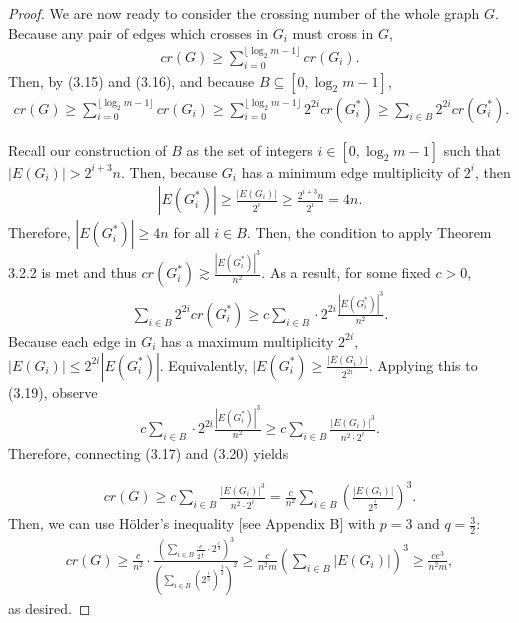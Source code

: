 \documentclass{scrippsthesisclass}
\theoremstyle{definition}
\begin{document}
\begin{proof}
We are now ready to consider the crossing number of the whole graph $G$. 
Because any pair of edges which crosses in $G_i$ must cross in $G$,  
\begin{align}
cr(G) \geq \sum_{i=0}^{\lfloor \log_2 m - 1 \rfloor} cr(G_i). 
\end{align}
Then, by (3.15) and (3.16), and because $B \subseteq [0, \log_2 m - 1]$, 
\begin{align}
cr(G) \geq \sum_{i=0}^{\lfloor \log_2 m - 1\rfloor} cr(G_i) \geq \sum_{i=0}^{\lfloor \log_2 m - 1 \rfloor} 2^{2i} cr(G_i^*) \geq \sum_{i \in B} 2^{2i} cr(G_i^*).
\end{align}

Recall our construction of $B$ as the set of integers $i \in [0, \log_2 m - 1]$ such that $|E(G_i)| > 2^{i+3}n$.
Then, because $G_i$ has a minimum edge multiplicity of $2^i$, then 
\begin{align}
    |E(G_i^*)| \geq \frac{|E(G_i)|}{2^i} \geq \frac{2^{i + 3 } n}{2^i} = 4n.
\end{align}
Therefore, $|E(G_i^*)| \geq 4n$ for all $i \in B$.
Then, the condition to apply Theorem 3.2.2 is met and thus $cr(G_i^*) \gtrsim \frac{|E(G_i^*)|^3}{n^2}$. 
As a result, for some fixed $c > 0$,
\begin{align}
\sum_{i \in B} 2^{2i} cr(G_i^*) \geq c\sum_{i \in B} \cdot 2^{2i} \frac{|E(G_i^*)|^3}{n^2}. 
\end{align}
Because each edge in $G_i$ has a maximum multiplicity $2^{2i}$, $|E(G_i)| \leq 2^{2i} |E(G_i^*)|$.
Equivalently, $|E(G_i^*) \geq \frac{|E(G_i)|}{2^{2i}}$. 
Applying this to (3.19), observe
\begin{align}
c\sum_{i \in B} \cdot 2^{2i} \frac{|E(G_i^*)|^3}{n^2} \geq c\sum_{i \in B}  \frac{|E(G_i)|^3}{n^2 \cdot 2^i}.
\end{align}
Therefore, connecting (3.17) and (3.20) yields

\begin{align}
cr(G) \geq c\sum_{i \in B}  \frac{|E(G_i)|^3}{n^2 \cdot 2^i} = \frac{c}{n^2} \sum_{i \in B} \left( \frac{|E(G_i)|}{2^{\frac{i}{3}}} \right)^3. 
\end{align}
Then, we can use H\"{o}lder's inequality [see Appendix B] with $p = 3$ and $q = \frac{3}{2}$:
\begin{align}
cr(G) \geq \frac{c}{n^2} \cdot \frac{\left(\sum_{i \in B} \frac{e}{2^{\frac{i}{3}}} \cdot 2^{\frac{i}{3}}\right)^3}{\left( \sum_{i \in B} \left(2^{\frac{i}{3}}\right)^{\frac{3}{2}} \right)^2} \geq \frac{c}{n^2m} \left( \sum_{i \in B} |E(G_i)| \right)^3 \geq \frac{ce^3}{n^2m},
\end{align}
as desired.
\end{proof}
\end{document}
